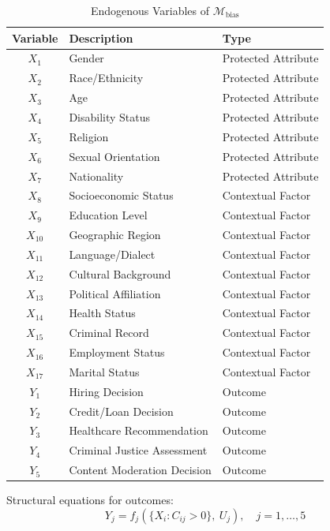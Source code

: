 \documentclass[12pt,a4paper]{report}
\theoremstyle{plain}
\theoremstyle{definition}
\theoremstyle{remark}
\newcommand{\scmmodel}{\mathcal{M}}
\begin{document}
\begin{table}[htbp]
\centering
\caption{Endogenous Variables of $\scmmodel_{\text{bias}}$}
\label{tab:variables}
\begin{tabular}{cll}
\toprule
\textbf{Variable} & \textbf{Description} & \textbf{Type} \\
\midrule
$X_1$  & Gender              & Protected Attribute \\
$X_2$  & Race/Ethnicity      & Protected Attribute \\
$X_3$  & Age                 & Protected Attribute \\
$X_4$  & Disability Status   & Protected Attribute \\
$X_5$  & Religion            & Protected Attribute \\
$X_6$  & Sexual Orientation  & Protected Attribute \\
$X_7$  & Nationality         & Protected Attribute \\
$X_8$  & Socioeconomic Status & Contextual Factor \\
$X_9$  & Education Level     & Contextual Factor \\
$X_{10}$ & Geographic Region & Contextual Factor \\
$X_{11}$ & Language/Dialect  & Contextual Factor \\
$X_{12}$ & Cultural Background & Contextual Factor \\
$X_{13}$ & Political Affiliation & Contextual Factor \\
$X_{14}$ & Health Status     & Contextual Factor \\
$X_{15}$ & Criminal Record   & Contextual Factor \\
$X_{16}$ & Employment Status & Contextual Factor \\
$X_{17}$ & Marital Status    & Contextual Factor \\
\midrule
$Y_1$  & Hiring Decision     & Outcome \\
$Y_2$  & Credit/Loan Decision & Outcome \\
$Y_3$  & Healthcare Recommendation & Outcome \\
$Y_4$  & Criminal Justice Assessment & Outcome \\
$Y_5$  & Content Moderation Decision & Outcome \\
\bottomrule
\end{tabular}
\end{table}

Structural equations for outcomes:
\begin{equation}
    Y_j = f_j\!\left(\{X_i : C_{ij} > 0\},\ U_j\right),
    \quad j = 1, \ldots, 5
\end{equation}
\end{document}
